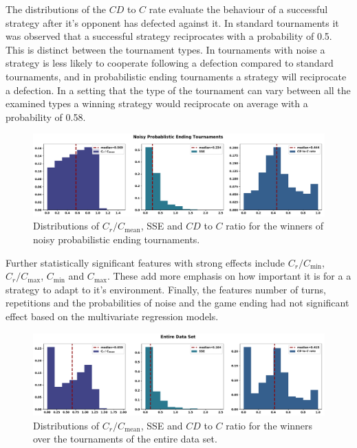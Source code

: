 \documentclass{article}
\begin{document}
The distributions of the \(CD\) to \(C\) rate evaluate the behaviour of a
successful strategy after it's opponent has defected against it. In standard
tournaments it was observed that a successful strategy reciprocates with a
probability of 0.5. This is distinct between the tournament types. In
tournaments with noise a strategy is less likely to cooperate following a
defection compared to standard tournaments, and in probabilistic ending
tournaments a strategy will reciprocate a defection. In a setting that the type
of the tournament can vary between all the examined types a winning strategy
would reciprocate on average with a probability of 0.58.

\begin{figure}[!htbp]
    \centering
        \centering
        \includegraphics[width=\textwidth]{../images/probend_noisy_discussion.pdf}
        \caption{Distributions of \(C_r / C_{\text{mean}}\), SSE and \(CD\) to \(C\) ratio
        for the winners of noisy probabilistic ending tournaments.}
        \label{fig:discussion_probend_noisy}
\end{figure}

Further statistically significant features with strong effects include \(C_r /
C_{\text{min}}\), \(C_r / C_{\text{max}}\), \(C_{\text{min}}\) and
\(C_{\text{max}}\). These add more emphasis on how important it is for a  a
strategy to adapt to it's environment. Finally, the features number of turns,
repetitions and the probabilities of noise and the game ending had not
significant effect based on the multivariate regression models.

\begin{figure}[!htbp]
    \centering
        \centering
        \includegraphics[width=\textwidth]{../images/entire_data_discussion.pdf}
        \caption{Distributions of \(C_r / C_{\text{mean}}\), SSE and \(CD\) to \(C\) ratio
        for the winners over the tournaments of the entire data set.}
        \label{fig:discussion_entire_data}
\end{figure}
\end{document}
